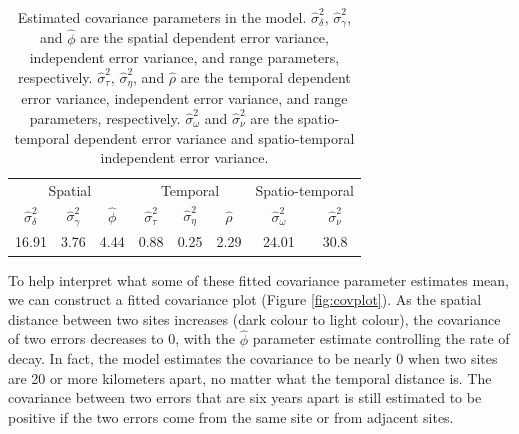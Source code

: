 \documentclass[]{interact}
\theoremstyle{plain}%
\theoremstyle{definition}
\theoremstyle{remark}
\begin{document}
\begin{table}[H]

\caption{\label{tab:paramest}Estimated covariance parameters in the model. $\hat{\sigma}^2_{\delta}$, $\hat{\sigma}^2_{\gamma}$, and $\hat{\phi}$ are the spatial dependent error variance, independent error variance, and range parameters, respectively. $\hat{\sigma}^2_{\tau}$, $\hat{\sigma}^2_{\eta}$, and $\hat{\rho}$ are the temporal dependent error variance, independent error variance, and range parameters, respectively. $\hat{\sigma}^2_{\omega}$ and $\hat{\sigma}^2_{\nu}$ are the spatio-temporal dependent error variance and spatio-temporal independent error variance.}
\centering
\begin{tabular}[t]{cccccccc}
\toprule
\multicolumn{3}{c}{Spatial} & \multicolumn{3}{c}{Temporal} & \multicolumn{2}{c}{Spatio-temporal} \\
\cmidrule(l{3pt}r{3pt}){1-3} \cmidrule(l{3pt}r{3pt}){4-6} \cmidrule(l{3pt}r{3pt}){7-8}
$\hat{\sigma}^2_{\delta}$ & $\hat{\sigma}^2_{\gamma}$ & $\hat{\phi}$ & $\hat{\sigma}^2_{\tau}$ & $\hat{\sigma}^2_{\eta}$ & $\hat{\rho}$ & $\hat{\sigma}^2_{\omega}$ & $\hat{\sigma}^2_{\nu}$\\
\midrule
16.91 & 3.76 & 4.44 & 0.88 & 0.25 & 2.29 & 24.01 & 30.8\\
\bottomrule
\end{tabular}
\end{table}

To help interpret what some of these fitted covariance parameter
estimates mean, we can construct a fitted covariance plot (Figure
\ref{fig:covplot}). As the spatial distance between two sites increases
(dark colour to light colour), the covariance of two errors decreases to
0, with the \(\hat{\phi}\) parameter estimate controlling the rate of
decay. In fact, the model estimates the covariance to be nearly 0 when
two sites are 20 or more kilometers apart, no matter what the temporal
distance is. The covariance between two errors that are six years apart
is still estimated to be positive if the two errors come from the same
site or from adjacent sites.
\end{document}
